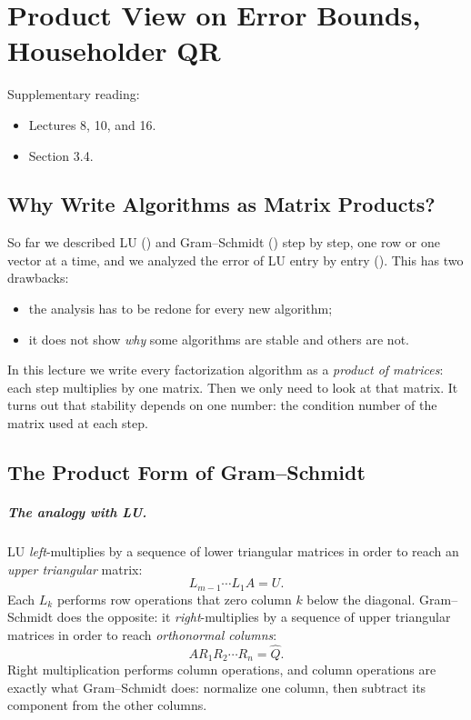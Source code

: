 \chapter{Product View on Error Bounds, Householder QR}
\label{ch:householder}

Supplementary reading:
\begin{itemize}
  \item \cite{TB} Lectures 8, 10, and 16.
  \item \cite{Demmel} Section 3.4.
\end{itemize}

\section{Why Write Algorithms as Matrix Products?}

So far we described LU () and Gram--Schmidt () step by step, one row or one vector at a time, and we analyzed the error of LU entry by entry (). This has two drawbacks:
\begin{itemize}
  \item the analysis has to be redone for every new algorithm;
  \item it does not show \emph{why} some algorithms are stable and others are not.
\end{itemize}
In this lecture we write every factorization algorithm as a \emph{product of matrices}: each step multiplies by one matrix. Then we only need to look at that matrix. It turns out that stability depends on one number: the condition number of the matrix used at each step.

\section{The Product Form of Gram--Schmidt}

\paragraph{The analogy with LU.} LU \emph{left}-multiplies by a sequence of lower triangular matrices in order to reach an \emph{upper triangular} matrix:
\begin{equation}
  L_{m-1} \cdots L_1 A = U.
\end{equation}
Each $L_k$ performs row operations that zero column $k$ below the diagonal. Gram--Schmidt does the opposite: it \emph{right}-multiplies by a sequence of upper triangular matrices in order to reach \emph{orthonormal columns}:
\begin{equation}
  AR_1R_2 \cdots R_n = \hat{Q}.
\end{equation}
Right multiplication performs column operations, and column operations are exactly what Gram--Schmidt does: normalize one column, then subtract its component from the other columns.

